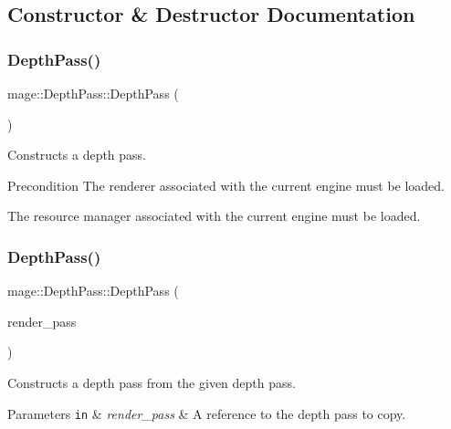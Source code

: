 \subsection{Constructor \& Destructor Documentation}
\hypertarget{classmage_1_1_depth_pass_a16a23f6820a11faf9195b307474e355b}{}\label{classmage_1_1_depth_pass_a16a23f6820a11faf9195b307474e355b} 
\subsubsection{\texorpdfstring{Depth\+Pass()}{DepthPass()}\hspace{0.1cm}{\footnotesize\ttfamily [1/3]}}
{\footnotesize\ttfamily mage\+::\+Depth\+Pass\+::\+Depth\+Pass (\begin{DoxyParamCaption}{ }\end{DoxyParamCaption})}

Constructs a depth pass.

\begin{DoxyPrecond}{Precondition}
The renderer associated with the current engine must be loaded. 

The resource manager associated with the current engine must be loaded. 
\end{DoxyPrecond}
\hypertarget{classmage_1_1_depth_pass_a9f0376b1423404dcced29535d59dd18c}{}\label{classmage_1_1_depth_pass_a9f0376b1423404dcced29535d59dd18c} 
\subsubsection{\texorpdfstring{Depth\+Pass()}{DepthPass()}\hspace{0.1cm}{\footnotesize\ttfamily [2/3]}}
{\footnotesize\ttfamily mage\+::\+Depth\+Pass\+::\+Depth\+Pass (\begin{DoxyParamCaption}\item[{const \hyperlink{classmage_1_1_depth_pass}{Depth\+Pass} \&}]{render\+\_\+pass }\end{DoxyParamCaption})\hspace{0.3cm}{\ttfamily [delete]}}

Constructs a depth pass from the given depth pass.


\begin{DoxyParams}[1]{Parameters}
\mbox{\tt in}  & {\em render\+\_\+pass} & A reference to the depth pass to copy. \\
\hline
\end{DoxyParams}
\hypertarget{classmage_1_1_depth_pass_a7f6f3a471223f224492b286d74a59325}{}\label{classmage_1_1_depth_pass_a7f6f3a471223f224492b286d74a59325} 
